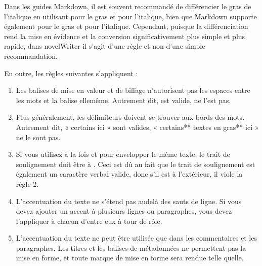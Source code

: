 \documentclass[a4paper,11pt,french]{sphinxmanual}
\begin{document}
\sphinxAtStartPar
Dans les guides Markdown, il est souvent recommandé de différencier le gras de l’italique en utilisant \sphinxcode{\sphinxupquote{**}} pour le gras et \sphinxcode{\sphinxupquote{\_}} pour l’italique, bien que Markdown supporte également \sphinxcode{\sphinxupquote{\_\_}} pour le gras et \sphinxcode{\sphinxupquote{*}} pour l’italique. Cependant, puisque la différenciation rend la mise en évidence et la conversion significativement plus simple et plus rapide, dans novelWriter il s’agit d’une règle et non d’une simple recommandation.

\sphinxAtStartPar
En outre, les règles suivantes s’appliquent :
\begin{enumerate}
%
\item {} 
\sphinxAtStartPar
Les balises de mise en valeur et de biffage n’autorisent pas les espaces entre les mots et la balise elle\sphinxhyphen{}même. Autrement dit,  est valide,  ne l’est pas.

\item {} 
\sphinxAtStartPar
Plus généralement, les délimiteurs doivent se trouver aux bords des mots. Autrement dit, « certains  ici » sont valides, « certains** textes en gras** ici » ne le sont pas.

\item {} 
\sphinxAtStartPar
Si vous utilisez à la fois \sphinxcode{\sphinxupquote{**}} et \sphinxcode{\sphinxupquote{\_}} pour envelopper le même texte, le trait de soulignement doit être à . Ceci est dû au fait que le trait de soulignement est également un caractère verbal valide, donc s’il est à l’extérieur, il viole la règle 2.

\item {} 
\sphinxAtStartPar
L’accentuation du texte ne s’étend pas au\sphinxhyphen{}delà des sauts de ligne. Si vous devez ajouter un accent à plusieurs lignes ou paragraphes, vous devez l’appliquer à chacun d’entre eux à tour de rôle.

\item {} 
\sphinxAtStartPar
L’accentuation du texte ne peut être utilisée que dans les commentaires et les paragraphes. Les titres et les balises de métadonnées ne permettent pas la mise en forme, et toute marque de mise en forme sera rendue telle quelle.

\end{enumerate}
\end{document}
